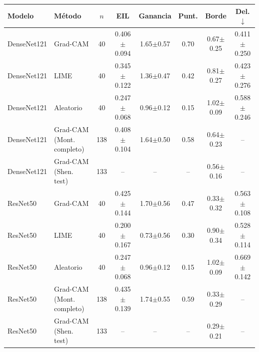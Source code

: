 \begin{tabular}{llcccccc}
\toprule
Modelo & Método & $n$ & EIL & Ganancia & Punt. & Borde & Del.$\downarrow$ \\
\midrule
DenseNet121 & Grad-CAM & 40 & 0.406$\pm$0.094 & 1.65$\pm$0.57 & 0.70 & 0.67$\pm$0.25 & 0.411$\pm$0.250 \\
DenseNet121 & LIME & 40 & 0.345$\pm$0.122 & 1.36$\pm$0.47 & 0.42 & 0.81$\pm$0.27 & 0.423$\pm$0.276 \\
DenseNet121 & Aleatorio & 40 & 0.247$\pm$0.068 & 0.96$\pm$0.12 & 0.15 & 1.02$\pm$0.09 & 0.588$\pm$0.246 \\
DenseNet121 & Grad-CAM (Mont. completo) & 138 & 0.408$\pm$0.104 & 1.64$\pm$0.50 & 0.58 & 0.64$\pm$0.23 & -- \\
DenseNet121 & Grad-CAM (Shen. test) & 133 & -- & -- & -- & 0.56$\pm$0.16 & -- \\
\midrule
ResNet50 & Grad-CAM & 40 & 0.425$\pm$0.144 & 1.70$\pm$0.56 & 0.47 & 0.33$\pm$0.32 & 0.563$\pm$0.108 \\
ResNet50 & LIME & 40 & 0.200$\pm$0.167 & 0.73$\pm$0.56 & 0.30 & 0.90$\pm$0.34 & 0.528$\pm$0.114 \\
ResNet50 & Aleatorio & 40 & 0.247$\pm$0.068 & 0.96$\pm$0.12 & 0.15 & 1.02$\pm$0.09 & 0.669$\pm$0.142 \\
ResNet50 & Grad-CAM (Mont. completo) & 138 & 0.435$\pm$0.139 & 1.74$\pm$0.55 & 0.59 & 0.33$\pm$0.29 & -- \\
ResNet50 & Grad-CAM (Shen. test) & 133 & -- & -- & -- & 0.29$\pm$0.21 & -- \\
\bottomrule
\end{tabular}
